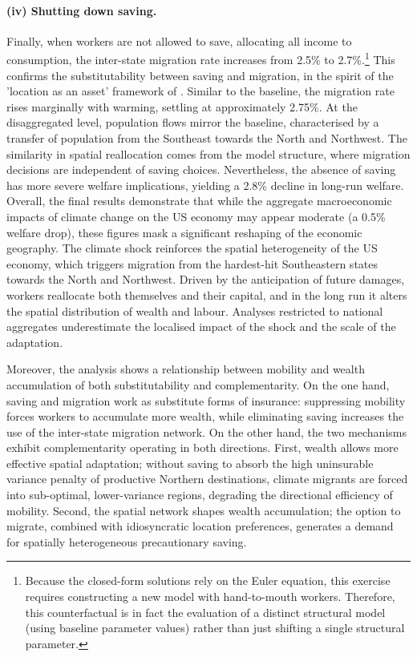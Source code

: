 \documentclass[12pt, a4paper]{article}
\begin{document}
\paragraph{(iv) Shutting down saving.} Finally, when workers are not allowed to save, allocating all income to consumption, the inter-state migration rate increases from 2.5\% to 2.7\%.\footnote{Because the closed-form solutions rely on the Euler equation, this exercise requires constructing a new model with hand-to-mouth workers. Therefore, this counterfactual is in fact the evaluation of a distinct structural model (using baseline parameter values) rather than just shifting a single structural parameter.} This confirms the substitutability between saving and migration, in the spirit of the 'location as an asset' framework of \citet{bilal_location_2021}. Similar to the baseline, the migration rate rises marginally with warming, settling at approximately 2.75\%. At the disaggregated level, population flows mirror the baseline, characterised by a transfer of population from the Southeast towards the North and Northwest. The similarity in spatial reallocation comes from the model structure, where migration decisions are independent of saving choices. Nevertheless, the absence of saving has more severe welfare implications, yielding a 2.8\% decline in long-run welfare. \\ 

Overall, the final results demonstrate that while the aggregate macroeconomic impacts of climate change on the US economy may appear moderate (a 0.5\% welfare drop), these figures mask a significant reshaping of the economic geography. The climate shock reinforces the spatial heterogeneity of the US economy, which triggers migration from the hardest-hit Southeastern states towards the North and Northwest. Driven by the anticipation of future damages, workers reallocate both themselves and their capital, and in the long run it alters the spatial distribution of wealth and labour. Analyses restricted to national aggregates underestimate the localised impact of the shock and the scale of the adaptation. 

Moreover, the analysis shows a relationship between mobility and wealth accumulation of both substitutability and complementarity. On the one hand, saving and migration work as substitute forms of insurance: suppressing mobility forces workers to accumulate more wealth, while eliminating saving increases the use of the inter-state migration network. On the other hand, the two mechanisms exhibit complementarity operating in both directions. First, wealth allows more effective spatial adaptation; without saving to absorb the high uninsurable variance penalty of productive Northern destinations, climate migrants are forced into sub-optimal, lower-variance regions, degrading the directional efficiency of mobility. Second, the spatial network shapes wealth accumulation; the option to migrate, combined with idiosyncratic location preferences, generates a demand for spatially heterogeneous precautionary saving.
\end{document}
